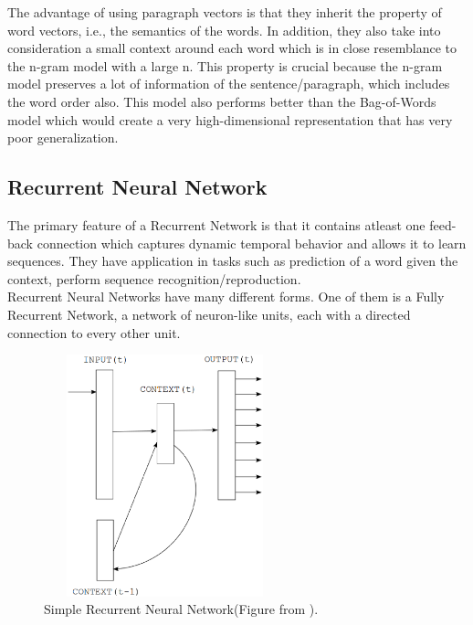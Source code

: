 \documentclass[11pt,a4paper]{article}
\begin{document}
The advantage of using paragraph vectors is that they inherit the property of word vectors, i.e., the semantics of the words. In addition, they also take into consideration a small context around each word which is in close resemblance to the n-gram model with a large n. This property is crucial because the n-gram model preserves a lot of information of the sentence/paragraph, which includes the word order also. This model also performs better than the Bag-of-Words model which would create a very high-dimensional representation that has very poor generalization.

\subsection{Recurrent Neural Network}
\label{sec:rnn}
The primary feature of a Recurrent Network is that it contains atleast one feed-back connection which captures dynamic temporal behavior and allows it to learn sequences. They have application in tasks such as prediction of a word given the context, perform sequence recognition/reproduction.\\
Recurrent Neural Networks have many different forms. One of them is a Fully Recurrent Network, a network of neuron-like units, each with a directed connection to every other unit.\\
\begin{figure}[ht!]
\centering
\includegraphics[width=70mm, height=70mm]{img/rnn.eps}
\caption{Simple Recurrent Neural Network(Figure from \cite{Mikolov:10}). \label{fig:rnn}}
\end{figure}
\end{document}
